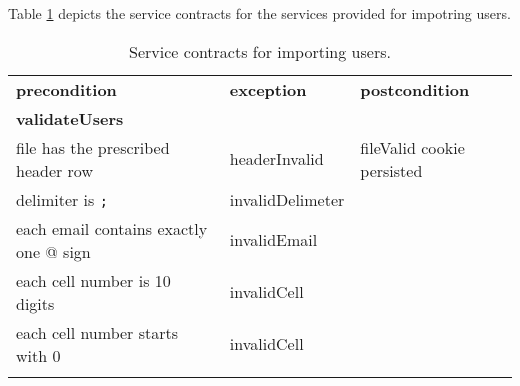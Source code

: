 Table \ref{tab:userImport} depicts the service contracts for the services provided for impotring users.

\begin{table}[htb]
\caption{Service contracts for importing users. \label{tab:teaminfoimport}}
\label{tab:userImport}
\begin{tabular}{l l l}
\hline
\noalign{\smallskip}
\textbf{precondition}&\textbf{exception} &\textbf{postcondition}\\
\noalign{\smallskip}
\hline
\textbf{validateUsers}\\
file has the prescribed header row & headerInvalid & fileValid cookie persisted\\
delimiter is \verb|;| &invalidDelimeter \\
each email contains exactly one @ sign & invalidEmail \\ 
each cell number is 10 digits & invalidCell \\
each cell number starts with 0 & invalidCell \\
\noalign{\smallskip}
\hline
\end{tabular}  
\end{table}
 